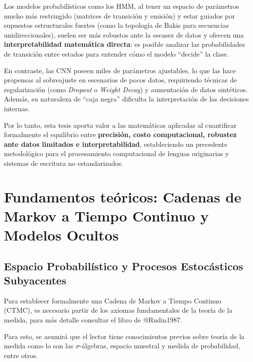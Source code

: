 \documentclass[
  spanish,
  us-letterpaper,
  DIV=11,
  numbers=noendperiod]{scrreprt}
\begin{document}
Los modelos probabilísticos como los HMM, al tener un espacio de
parámetros mucho más restringido (matrices de transición y emisión) y
estar guiados por supuestos estructurales fuertes (como la topología de
Bakis para secuencias unidireccionales), suelen ser más robustos ante la
escasez de datos y ofrecen una \textbf{interpretabilidad matemática
directa}: es posible analizar las probabilidades de transición entre
estados para entender cómo el modelo ``decide'' la clase.

En contraste, las CNN poseen miles de parámetros ajustables, lo que las
hace propensas al sobreajuste en escenarios de pocos datos, requiriendo
técnicas de regularización (como \emph{Dropout} o \emph{Weight Decay}) y
aumentación de datos sintéticos. Además, su naturaleza de ``caja negra''
dificulta la interpretación de las decisiones internas.

Por lo tanto, esta tesis aporta valor a las matemáticas aplicadas al
cuantificar formalmente el equilibrio entre \textbf{precisión, costo
computacional, robustez ante datos limitados e interpretabilidad},
estableciendo un precedente metodológico para el procesamiento
computacional de lenguas originarias y sistemas de escritura no
estandarizados.


\chapter{Fundamentos teóricos: Cadenas de Markov a Tiempo Continuo y
Modelos
Ocultos}\label{fundamentos-teuxf3ricos-cadenas-de-markov-a-tiempo-continuo-y-modelos-ocultos}

\section{Espacio Probabilístico y Procesos Estocásticos
Subyacentes}\label{espacio-probabiluxedstico-y-procesos-estocuxe1sticos-subyacentes}

Para establecer formalmente una Cadena de Markov a Tiempo Continuo
(CTMC), es necesario partir de los axiomas fundamentales de la teoría de
la medida, para más detalle consultar el libro de @Rudin1987.

Para esto, se asumirá que el lector tiene conocimientos previos sobre
teoría de la medida como lo son las \(\sigma\)-álgebras, espacio
muestral y medida de probabilidad, entre otros.
\end{document}
